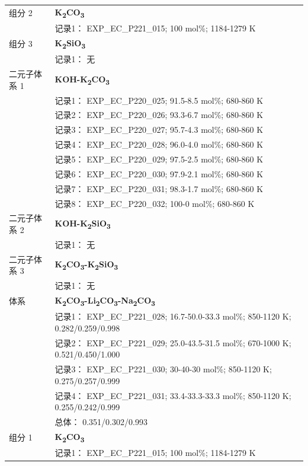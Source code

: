 \documentclass[12pt]{article}
\begin{document}
{\begin{longtable}[]{@{}
  >{\raggedright\arraybackslash}p{}
  >{\raggedright\arraybackslash}p{}@{}}
组分 2  & \textbf{K\textsubscript{2}CO\textsubscript{3}} \\
 & 记录1： EXP\_EC\_P221\_015; 100 mol\%; 1184-1279 K  \\

组分 3 & \textbf{K\textsubscript{2}SiO\textsubscript{3}} \\
 & 记录1： 无 \\
二元子体系 1  & \textbf{KOH-K\textsubscript{2}CO\textsubscript{3}} \\
 & 记录1： EXP\_EC\_P220\_025; 91.5-8.5 mol\%; 680-860 K \\
 & 记录2： EXP\_EC\_P220\_026; 93.3-6.7 mol\%; 680-860 K \\
 & 记录3： EXP\_EC\_P220\_027; 95.7-4.3 mol\%; 680-860 K \\
 & 记录4： EXP\_EC\_P220\_028; 96.0-4.0 mol\%; 680-860 K \\
 & 记录5： EXP\_EC\_P220\_029; 97.5-2.5 mol\%; 680-860 K \\
 & 记录6： EXP\_EC\_P220\_030; 97.9-2.1 mol\%; 680-860 K \\
 & 记录7： EXP\_EC\_P220\_031; 98.3-1.7 mol\%; 680-860 K \\
 & 记录8： EXP\_EC\_P220\_032; 100-0 mol\%; 680-860 K  \\

二元子体系 2 & \textbf{KOH-K\textsubscript{2}SiO\textsubscript{3}} \\
 & 记录1： 无 \\
二元子体系 3 & \textbf{K\textsubscript{2}CO\textsubscript{3}-K\textsubscript{2}SiO\textsubscript{3}} \\
 & 记录1： 无 \\
\midrule
体系 & \textbf{K\textsubscript{2}CO\textsubscript{3}-Li\textsubscript{2}CO\textsubscript{3}-Na\textsubscript{2}CO\textsubscript{3}} \\
 & 记录1： EXP\_EC\_P221\_028; 16.7-50.0-33.3 mol\%; 850-1120 K; 0.282/0.259/0.998 \\
 & 记录2： EXP\_EC\_P221\_029; 25.0-43.5-31.5 mol\%; 670-1000 K; 0.521/0.450/1.000 \\
 & 记录3： EXP\_EC\_P221\_030; 30-40-30 mol\%; 850-1120 K; 0.275/0.257/0.999 \\
 & 记录4： EXP\_EC\_P221\_031; 33.4-33.3-33.3 mol\%; 850-1120 K; 0.255/0.242/0.999 \\
 & 总体： 0.351/0.302/0.993  \\

组分 1  & \textbf{K\textsubscript{2}CO\textsubscript{3}} \\
 & 记录1： EXP\_EC\_P221\_015; 100 mol\%; 1184-1279 K  \\


\end{longtable}}
\end{document}
